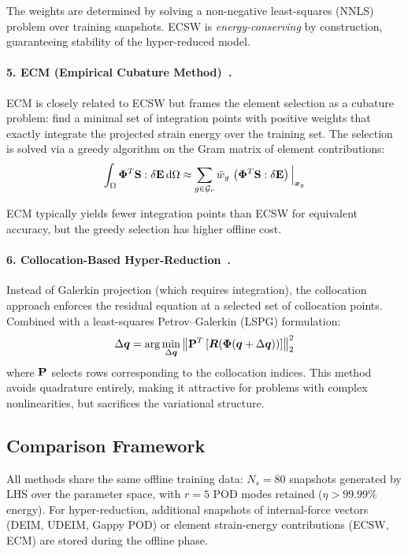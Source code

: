 The weights are determined by solving a non-negative least-squares (NNLS) problem over training snapshots. ECSW is \emph{energy-conserving} by construction, guaranteeing stability of the hyper-reduced model.

\paragraph{5. ECM (Empirical Cubature Method)~\cite{hernandez2017}.}
ECM is closely related to ECSW but frames the element selection as a cubature problem: find a minimal set of integration points with positive weights that exactly integrate the projected strain energy over the training set. The selection is solved via a greedy algorithm on the Gram matrix of element contributions:
\begin{equation}
    \int_{\Omega} \mathbf{\Phi}^T \mathbf{S} : \delta\mathbf{E}\, \mathrm{d}\Omega \approx \sum_{g \in \mathcal{G}_r} \tilde{w}_g \, \left(\mathbf{\Phi}^T \mathbf{S} : \delta\mathbf{E}\right)\Big|_{\bm{x}_g}
\end{equation}

ECM typically yields fewer integration points than ECSW for equivalent accuracy, but the greedy selection has higher offline cost.

\paragraph{6. Collocation-Based Hyper-Reduction~\cite{carlberg2011}.}
Instead of Galerkin projection (which requires integration), the collocation approach enforces the residual equation at a selected set of collocation points. Combined with a least-squares Petrov--Galerkin (LSPG) formulation:
\begin{equation}
    \Delta\bm{q} = \arg\min_{\Delta\bm{q}} \left\| \mathbf{P}^T \left[\bm{R}(\mathbf{\Phi}(\bm{q} + \Delta\bm{q}))\right] \right\|_2^2
\end{equation}
where $\mathbf{P}$ selects rows corresponding to the collocation indices. This method avoids quadrature entirely, making it attractive for problems with complex nonlinearities, but sacrifices the variational structure.

\subsection{Comparison Framework}

All methods share the same offline training data: $N_s = 80$ snapshots generated by LHS over the parameter space, with $r = 5$ POD modes retained ($\eta > 99.99\%$ energy). For hyper-reduction, additional snapshots of internal-force vectors (DEIM, UDEIM, Gappy POD) or element strain-energy contributions (ECSW, ECM) are stored during the offline phase.

